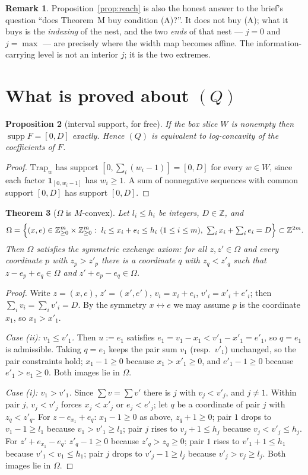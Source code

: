 \documentclass[11pt]{article}
\theoremstyle{plain}
\newtheorem{theorem}{Theorem}
\newtheorem{proposition}[theorem]{Proposition}
\theoremstyle{definition}
\newtheorem{remark}[theorem]{Remark}
\DeclareMathOperator{\supp}{supp}
\newcommand{\Trap}{\mathrm{Trap}}
\newcommand{\Z}{\mathbb{Z}}
\begin{document}
\begin{remark}
Proposition~\ref{prop:reach} is also the honest answer to the brief's question ``does
Theorem~M buy condition (A)?''. It does not buy (A); what it buys is the \emph{indexing}
of the nest, and the two \emph{ends} of that nest --- $j=0$ and $j=\max$ --- are precisely
where the width map becomes affine. The information-carrying level is not an interior $j$;
it is the two extremes.
\end{remark}

\section{What is proved about $(Q)$}\label{sec:Q}

\begin{proposition}[interval support, for free]\label{prop:supp}
If the box slice $W$ is nonempty then $\supp F=[0,D]$ exactly. Hence $(Q)$ is equivalent
to log-concavity of the coefficients of $F$.
\end{proposition}
\begin{proof}
$\Trap_w$ has support $[0,\sum_i(w_i-1)]=[0,D]$ for every $w\in W$, since each factor
$\mathbf1_{[0,w_i-1]}$ has $w_i\ge1$. A sum of nonnegative sequences with common support
$[0,D]$ has support $[0,D]$.
\end{proof}

\begin{theorem}[$\Omega$ is $M$-convex]\label{thm:Mconv}
Let $l_i\le h_i$ be integers, $D\in\Z$, and
\[
  \Omega=\Bigl\{(x,e)\in\Z_{\ge0}^m\times\Z_{\ge0}^m:\ l_i\le x_i+e_i\le h_i\ (1\le i\le m),\
  \textstyle\sum_ix_i+\sum_ie_i=D\Bigr\}\subset\Z^{2m}.
\]
Then $\Omega$ satisfies the symmetric exchange axiom: for all $z,z'\in\Omega$ and every
coordinate $p$ with $z_p>z'_p$ there is a coordinate $q$ with $z_q<z'_q$ such that
$z-e_p+e_q\in\Omega$ and $z'+e_p-e_q\in\Omega$.
\end{theorem}
\begin{proof}
Write $z=(x,e)$, $z'=(x',e')$, $v_i=x_i+e_i$, $v'_i=x'_i+e'_i$; then
$\sum_iv_i=\sum_iv'_i=D$. By the symmetry $x\leftrightarrow e$ we may assume $p$ is the
coordinate $x_1$, so $x_1>x'_1$.

\emph{Case (ii): $v_1\le v'_1$.} Then $u:=e_1$ satisfies
$e_1=v_1-x_1<v'_1-x'_1=e'_1$, so $q=e_1$ is admissible. Taking $q=e_1$ keeps the pair sum
$v_1$ (resp.\ $v'_1$) unchanged, so the pair constraints hold; $x_1-1\ge0$ because
$x_1>x'_1\ge0$, and $e'_1-1\ge0$ because $e'_1>e_1\ge0$. Both images lie in $\Omega$.

\emph{Case (i): $v_1>v'_1$.} Since $\sum v=\sum v'$ there is $j$ with $v_j<v'_j$, and
$j\ne1$. Within pair $j$, $v_j<v'_j$ forces $x_j<x'_j$ or $e_j<e'_j$; let $q$ be a
coordinate of pair $j$ with $z_q<z'_q$. For $z-e_{x_1}+e_q$: $x_1-1\ge0$ as above,
$z_q+1\ge0$; pair $1$ drops to $v_1-1\ge l_1$ because $v_1>v'_1\ge l_1$; pair $j$ rises to
$v_j+1\le h_j$ because $v_j<v'_j\le h_j$. For $z'+e_{x_1}-e_q$: $z'_q-1\ge0$ because
$z'_q>z_q\ge0$; pair $1$ rises to $v'_1+1\le h_1$ because $v'_1<v_1\le h_1$; pair $j$
drops to $v'_j-1\ge l_j$ because $v'_j>v_j\ge l_j$. Both images lie in $\Omega$.
\end{proof}
\end{document}
